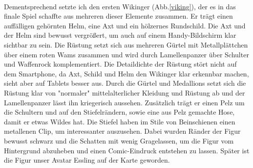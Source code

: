 \documentclass[extern,palatino]{cgBA}
\begin{document}
\\Dementsprechend setzte ich den ersten Wikinger (Abb.\ref{viking}), der es in das finale Spiel schaffte aus mehreren dieser Elemente zusammen. Er trägt einen auffälligen gehörnten Helm, eine Axt und ein hölzernes Rundschild. Die Axt und der Helm sind bewusst vergrößert, um auch auf einem Handy-Bildschirm klar sichtbar zu sein. Die Rüstung setzt sich aus mehreren Gürtel mit Metallplättchen über einem roten Wams zusammen und wird durch Lamellenpanzer über Schulter und Waffenrock komplementiert. Die Detaildichte der Rüstung stört nicht auf dem Smartphone, da Axt, Schild und Helm den Wikinger klar erkennbar machen, sieht aber auf Tablets besser aus. Durch die Gürtel und Medallions setzt sich die Rüstung klar von "normaler" mittelalterlicher Kleidung und Rüstung ab und der Lamellenpanzer lässt ihn kriegerisch aussehen. Zusätzlich trägt er einen Pelz um die Schultern und auf den Stiefelrändern, sowie eine aus Pelz gemachte Hose, damit er etwas Wildes hat. Die Stiefel haben im Stile von Beinschienen einen metallenen Clip, um interessanter auszusehen. Dabei wurden Ränder der Figur bewusst schwarz und die Schatten mit wenig Gragelassen, um die Figur vom Hintergrund abzuheben und einen Comic-Eindruck entstehen zu lassen. Später ist die Figur unser Avatar Essling auf der Karte geworden.
	
\newpage
\end{document}
